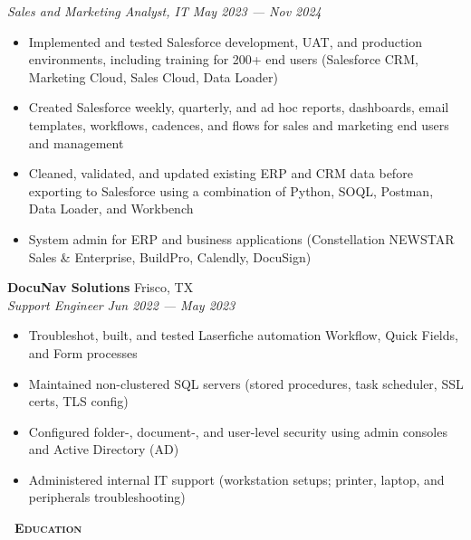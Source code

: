 \documentclass[a4paper,12pt]{article}
\newcommand{\header} [1] {
    \vspace{1mm}
    {\textsc{\textbf{\Large{\xrfill[0.5ex]{0.5pt}~#1~\xrfill[0.5ex]{0.5pt}}}}} %
    \vspace{1mm}
}
\begin{document}
\vspace{1mm}
\textit{Sales and Marketing Analyst, IT} \hfill  \textit{May 2023 --- Nov 2024}
\begin{itemize}
    \item Implemented and tested Salesforce development, UAT, and production environments, including training for 200+ end users (Salesforce CRM, Marketing Cloud, Sales Cloud, Data Loader) 
    \item Created Salesforce weekly, quarterly, and ad hoc reports, dashboards, email templates, workflows, cadences, and flows for sales and marketing end users and management
    \item Cleaned, validated, and updated existing ERP and CRM data before exporting to Salesforce using a combination of Python, SOQL, Postman, Data Loader, and Workbench
    \item System admin for ERP and business applications (Constellation NEWSTAR Sales \& Enterprise, BuildPro, Calendly, DocuSign)
\end{itemize}
\vspace{1mm}
\textbf{DocuNav Solutions} \hfill Frisco, TX \\
\textit{Support Engineer} \hfill  \textit{Jun 2022 --- May 2023}
\begin{itemize}
    \item Troubleshot, built, and tested Laserfiche automation Workflow, Quick Fields, and Form processes
    \item Maintained non-clustered SQL servers (stored procedures, task scheduler, SSL certs, TLS config)
    \item Configured folder-, document-, and user-level security using admin consoles and Active Directory (AD)
    \item Administered internal IT support (workstation setups; printer, laptop, and peripherals troubleshooting)
\end{itemize}    
\vspace{1mm}


\header{Education} 
\end{document}
